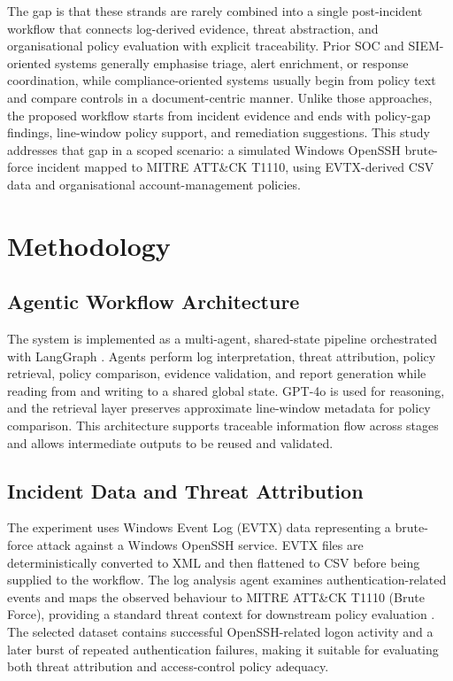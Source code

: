 \documentclass[conference]{IEEEtran}
\begin{document}
The gap is that these strands are rarely combined into a single post-incident workflow that connects log-derived evidence, threat abstraction, and organisational policy evaluation with explicit traceability. Prior SOC and SIEM-oriented systems generally emphasise triage, alert enrichment, or response coordination, while compliance-oriented systems usually begin from policy text and compare controls in a document-centric manner. Unlike those approaches, the proposed workflow starts from incident evidence and ends with policy-gap findings, line-window policy support, and remediation suggestions. This study addresses that gap in a scoped scenario: a simulated Windows OpenSSH brute-force incident mapped to MITRE ATT\&CK T1110, using EVTX-derived CSV data and organisational account-management policies.


\section{Methodology}

\subsection{Agentic Workflow Architecture}
The system is implemented as a multi-agent, shared-state pipeline orchestrated with LangGraph \cite{LangGraph2025, Taulli2025LangGraph}. Agents perform log interpretation, threat attribution, policy retrieval, policy comparison, evidence validation, and report generation while reading from and writing to a shared global state. GPT-4o is used for reasoning, and the retrieval layer preserves approximate line-window metadata for policy comparison. This architecture supports traceable information flow across stages and allows intermediate outputs to be reused and validated.

\subsection{Incident Data and Threat Attribution}
The experiment uses Windows Event Log (EVTX) data representing a brute-force attack against a Windows OpenSSH service. EVTX files are deterministically converted to XML and then flattened to CSV before being supplied to the workflow. The log analysis agent examines authentication-related events and maps the observed behaviour to MITRE ATT\&CK T1110 (Brute Force), providing a standard threat context for downstream policy evaluation \cite{MITREATTACK}. The selected dataset contains successful OpenSSH-related logon activity and a later burst of repeated authentication failures, making it suitable for evaluating both threat attribution and access-control policy adequacy.
\end{document}

